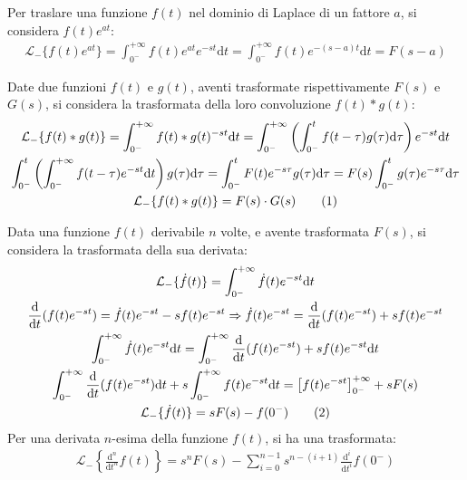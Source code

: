 \documentclass{article}
\numberwithin{equation}{subsection}
\newcommand{\df}{\mathrm{d}}
\newcommand{\tageq}{\tag{\stepcounter{equation}\theequation}}
\begin{document}
Per traslare una funzione $f(t)$ nel dominio di Laplace di un fattore $a$, si considera $f(t)e^{at}$:
\begin{gather}
    \mathcal{L}_-\{f(t)e^{at}\}=\displaystyle\int_{0^-}^{+\infty}f(t)e^{at}e^{-st}\df t=\int_{0^-}^{+\infty}f(t)e^{-(s-a)t}\df t=F(s-a)
\end{gather}

Date due funzioni $f(t)$ e $g(t)$, aventi trasformate rispettivamente $F(s)$ e $G(s)$, si considera la trasformata della loro convoluzione $f(t)*g(t)$:
\begin{gather*}
    \mathcal{L}_-\{f(t)*g(t)\}=\displaystyle\int_{0^-}^{+\infty}f(t)*g(t)^{-st}\df t=\int_{0^-}^{+\infty}\left(\int_{0^-}^{t}f(t-\tau)g(\tau)\df\tau\right)e^{-st} \df t\\
    \displaystyle\int_{0^-}^{t}\left(\int_{0^-}^{+\infty}f(t-\tau)e^{-st}\df t\right)g(\tau)\df\tau=\int_{0^-}^{t}F(t)e^{-s\tau}g(\tau)\df\tau=F(s)\int_{0^-}^{t}g(\tau)e^{-s\tau}\df\tau\\
    \mathcal{L}_-\{f(t)*g(t)\}=F(s)\cdot G(s)\tageq
\end{gather*}

Data una funzione $f(t)$ derivabile $n$ volte, e avente trasformata $F(s)$, si considera la trasformata della sua derivata:
\begin{gather*}
    \mathcal{L}_-\{\dot f(t)\}=\displaystyle\int_{0^-}^{+\infty}\dot f(t)e^{-st}\df t\\
    \displaystyle\frac{\df}{\df t}(f(t)e^{-st})=\dot f(t)e^{-st}-sf(t)e^{-st}\Rightarrow\dot f(t)e^{-st}=\frac{\df}{\df t}(f(t)e^{-st})+sf(t)e^{-st}\\
    \displaystyle\int_{0^-}^{+\infty}\dot f(t)e^{-st}\df t=\int_{0^-}^{+\infty}\frac{\df}{\df t}(f(t)e^{-st})+sf(t)e^{-st}\df t\\
    \displaystyle\int_{0^-}^{+\infty}\frac{\df}{\df t}(f(t)e^{-st})\df t+s\int_{0^-}^{+\infty}f(t)e^{-st}\df t=\left[f(t)e^{-st}\right]^{+\infty}_{0^-}+sF(s)\\
    \mathcal{L}_-\{\dot f(t)\}=sF(s)-f(0^-)\tageq
\end{gather*}
Per una derivata $n$-esima della funzione $f(t)$, si ha una trasformata:
\begin{gather}
    \mathcal{L}_-\left\{\displaystyle\frac{\df^n}{\df t^n}f(t)\right\}=s^nF(s)-\sum_{i=0}^{n-1}s^{n-(i+1)}\frac{\df^i}{\df t^i}f(0^-)
\end{gather}
\end{document}
